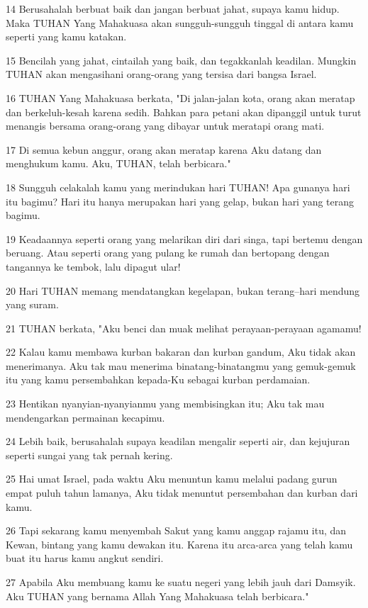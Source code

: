 \par 14 Berusahalah berbuat baik dan jangan berbuat jahat, supaya kamu hidup. Maka TUHAN Yang Mahakuasa akan sungguh-sungguh tinggal di antara kamu seperti yang kamu katakan.
\par 15 Bencilah yang jahat, cintailah yang baik, dan tegakkanlah keadilan. Mungkin TUHAN akan mengasihani orang-orang yang tersisa dari bangsa Israel.
\par 16 TUHAN Yang Mahakuasa berkata, "Di jalan-jalan kota, orang akan meratap dan berkeluh-kesah karena sedih. Bahkan para petani akan dipanggil untuk turut menangis bersama orang-orang yang dibayar untuk meratapi orang mati.
\par 17 Di semua kebun anggur, orang akan meratap karena Aku datang dan menghukum kamu. Aku, TUHAN, telah berbicara."
\par 18 Sungguh celakalah kamu yang merindukan hari TUHAN! Apa gunanya hari itu bagimu? Hari itu hanya merupakan hari yang gelap, bukan hari yang terang bagimu.
\par 19 Keadaannya seperti orang yang melarikan diri dari singa, tapi bertemu dengan beruang. Atau seperti orang yang pulang ke rumah dan bertopang dengan tangannya ke tembok, lalu dipagut ular!
\par 20 Hari TUHAN memang mendatangkan kegelapan, bukan terang--hari mendung yang suram.
\par 21 TUHAN berkata, "Aku benci dan muak melihat perayaan-perayaan agamamu!
\par 22 Kalau kamu membawa kurban bakaran dan kurban gandum, Aku tidak akan menerimanya. Aku tak mau menerima binatang-binatangmu yang gemuk-gemuk itu yang kamu persembahkan kepada-Ku sebagai kurban perdamaian.
\par 23 Hentikan nyanyian-nyanyianmu yang membisingkan itu; Aku tak mau mendengarkan permainan kecapimu.
\par 24 Lebih baik, berusahalah supaya keadilan mengalir seperti air, dan kejujuran seperti sungai yang tak pernah kering.
\par 25 Hai umat Israel, pada waktu Aku menuntun kamu melalui padang gurun empat puluh tahun lamanya, Aku tidak menuntut persembahan dan kurban dari kamu.
\par 26 Tapi sekarang kamu menyembah Sakut yang kamu anggap rajamu itu, dan Kewan, bintang yang kamu dewakan itu. Karena itu arca-arca yang telah kamu buat itu harus kamu angkut sendiri.
\par 27 Apabila Aku membuang kamu ke suatu negeri yang lebih jauh dari Damsyik. Aku TUHAN yang bernama Allah Yang Mahakuasa telah berbicara."

